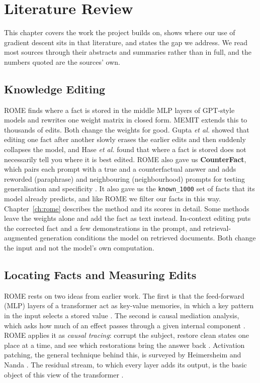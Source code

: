 \chapter{Literature Review}\label{ch:literature-review}

This chapter covers the work the project builds on, shows where our use of gradient descent sits in that literature, and states the gap we address. We read most sources through their abstracts and summaries rather than in full, and the numbers quoted are the sources' own.

\section{Knowledge Editing}

ROME \cite{r2} finds where a fact is stored in the middle MLP layers of GPT-style models and rewrites one weight matrix in closed form. MEMIT \cite{r3} extends this to thousands of edits. Both change the weights for good. Gupta \textit{et al.} \cite{r4} showed that editing one fact after another slowly erases the earlier edits and then suddenly collapses the model, and Hase \textit{et al.} \cite{r30} found that where a fact is stored does not necessarily tell you where it is best edited. ROME also gave us \textbf{CounterFact}, which pairs each prompt with a true and a counterfactual answer and adds reworded (paraphrase) and neighbouring (neighbourhood) prompts for testing generalisation and specificity \cite{r2,r65}. It also gave us the \texttt{known\_1000} set of facts that its model already predicts, and like ROME we filter our facts in this way. Chapter~\ref{ch:rome} describes the method and its scores in detail. Some methods leave the weights alone and add the fact as text instead. In-context editing \cite{r31} puts the corrected fact and a few demonstrations in the prompt, and retrieval-augmented generation \cite{r34} conditions the model on retrieved documents. Both change the input and not the model's own computation.

\section{Locating Facts and Measuring Edits}

ROME rests on two ideas from earlier work. The first is that the feed-forward (MLP) layers of a transformer act as key-value memories, in which a key pattern in the input selects a stored value \cite{r60}. The second is causal mediation analysis, which asks how much of an effect passes through a given internal component \cite{r59,r58}. ROME applies it as \emph{causal tracing}: corrupt the subject, restore clean states one place at a time, and see which restorations bring the answer back \cite{r2}. Activation patching, the general technique behind this, is surveyed by Heimersheim and Nanda \cite{r21}. The residual stream, to which every layer adds its output, is the basic object of this view of the transformer \cite{r53}.

